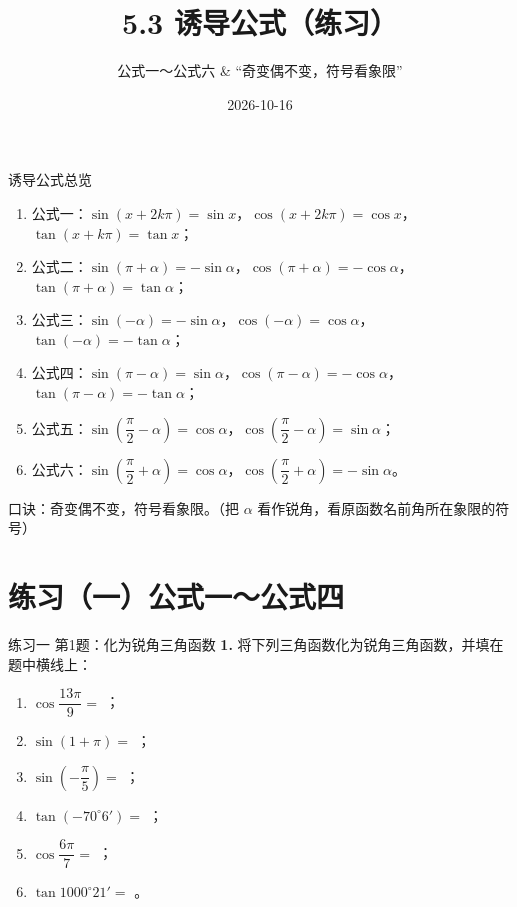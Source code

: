 \documentclass[10pt,aspectratio=169,serif]{beamer}
\title[诱导公式练习]{5.3 诱导公式（练习）}
\subtitle{公式一～公式六 \& “奇变偶不变，符号看象限”}
\author{}
\institute{}
\date{2026-10-16}
\begin{document}
\begin{frame}
  \titlepage
\end{frame}

\begin{frame}[t]{诱导公式总览}
\small
\begin{tcolorbox}[colback=blue!5,colframe=blue,title=\textbf{六组诱导公式（$k\in\mathbf Z$）}]
\begin{enumerate}
  \item 公式一：$\sin(x+2k\pi)=\sin x$，$\cos(x+2k\pi)=\cos x$，$\tan(x+k\pi)=\tan x$；
  \item 公式二：$\sin(\pi+\alpha)=-\sin\alpha$，$\cos(\pi+\alpha)=-\cos\alpha$，$\tan(\pi+\alpha)=\tan\alpha$；
  \item 公式三：$\sin(-\alpha)=-\sin\alpha$，$\cos(-\alpha)=\cos\alpha$，$\tan(-\alpha)=-\tan\alpha$；
  \item 公式四：$\sin(\pi-\alpha)=\sin\alpha$，$\cos(\pi-\alpha)=-\cos\alpha$，$\tan(\pi-\alpha)=-\tan\alpha$；
  \item 公式五：$\sin\!\left(\dfrac{\pi}{2}-\alpha\right)=\cos\alpha$，$\cos\!\left(\dfrac{\pi}{2}-\alpha\right)=\sin\alpha$；
  \item 公式六：$\sin\!\left(\dfrac{\pi}{2}+\alpha\right)=\cos\alpha$，$\cos\!\left(\dfrac{\pi}{2}+\alpha\right)=-\sin\alpha$。
\end{enumerate}
\end{tcolorbox}
\vspace{0.3em}
\alert{口诀：}奇变偶不变，符号看象限。（把 $\alpha$ 看作锐角，看原函数名前角所在象限的符号）
\end{frame}

\section*{练习（一）公式一～公式四}

\begin{frame}[t]{练习一 第1题：化为锐角三角函数}
\textbf{1.} 将下列三角函数化为锐角三角函数，并填在题中横线上：
\begin{enumerate}[(1)]
  \item $\cos\dfrac{13\pi}{9}=$ \underline{\hspace{2cm}}；
  \item $\sin(1+\pi)=$ \underline{\hspace{2cm}}；
  \item $\sin\!\left(-\dfrac{\pi}{5}\right)=$ \underline{\hspace{2cm}}；
  \item $\tan(-70^\circ6')=$ \underline{\hspace{2cm}}；
  \item $\cos\dfrac{6\pi}{7}=$ \underline{\hspace{2cm}}；
  \item $\tan 1000^\circ21'=$ \underline{\hspace{2cm}}。
\end{enumerate}
\end{frame}
\end{document}
